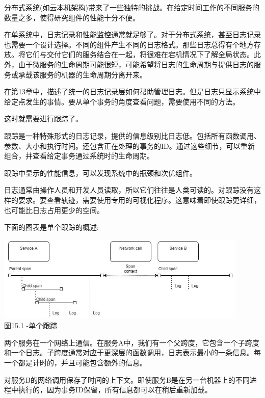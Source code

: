 
分布式系统(如云本机架构)带来了一些独特的挑战。在给定时间工作的不同服务的数量之多，使得研究组件的性能十分不便。

在单系统中，日志记录和性能监控通常就足够了。对于分布式系统，甚至日志记录也需要一个设计选择。不同的组件产生不同的日志格式。那些日志总得有个地方存放。将它们与交付它们的服务结合在一起，将很难在宕机情况下了解全局状态。此外，由于微服务的生命周期可能很短，可能希望将日志的生命周期与提供日志的服务或承载该服务的机器的生命周期分离开来。

在第13章中，描述了统一的日志记录层如何帮助管理日志。但是日志只显示系统中给定点发生的事情。要从单个事务的角度查看问题，需要使用不同的方法。

这时就需要进行跟踪了。


跟踪是一种特殊形式的日志记录，提供的信息级别比日志低。包括所有函数调用、参数、大小和执行时间。还包含正在处理的事务的ID。通过这些细节，可以重新组合，并查看给定事务通过系统时的生命周期。

跟踪中显示的性能信息，可以发现系统中的瓶颈和次优组件。

日志通常由操作人员和开发人员读取，所以它们往往是人类可读的。对跟踪没有这样的要求。要查看轨迹，需要使用专用的可视化程序。这意味着即使跟踪更详细，也可能比日志占用更少的空间。

下面的图表是单个跟踪的概述:

\begin{center}
\includegraphics[width=0.9\textwidth]{content/4/chapter15/images/1.jpg}\\
图15.1 -单个跟踪
\end{center}

两个服务在一个网络上通信。在服务A中，我们有一个父跨度，它包含一个子跨度和一个日志。子跨度通常对应于更深层的函数调用，日志表示最小的一条信息。每一个都是计时的，并且可能包含额外的信息。

对服务B的网络调用保存了时间的上下文。即使服务B是在另一台机器上的不同进程中执行的，因为事务ID保留，所有信息都可以在稍后重新加载。

